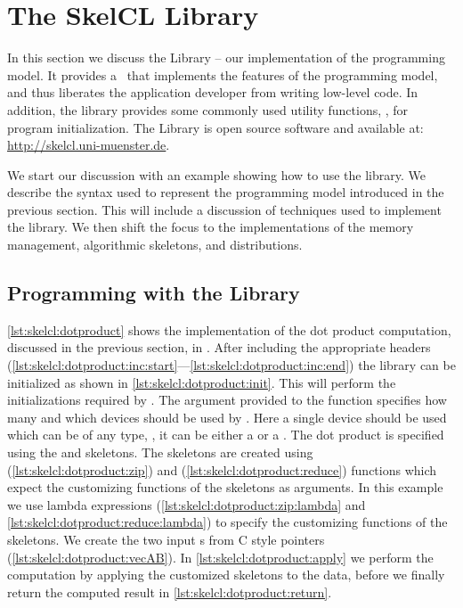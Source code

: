 \section{The SkelCL Library}
\label{section:skelcl-library}
In this section we discuss the \SkelCL Library -- our implementation of the \SkelCL programming model.
It provides a \Cpp~\API that implements the features of the \SkelCL programming model, and thus liberates the application developer from writing low-level code.
In addition, the library provides some commonly used utility functions, \eg, for program initialization.
The \SkelCL Library is open source software and available at: \url{http://skelcl.uni-muenster.de}.

We start our discussion with an example showing how to use the \SkelCL library.
We describe the syntax used to represent the \SkelCL programming model introduced in the previous section.
This will include a discussion of \Cpp techniques used to implement the library.
We then shift the focus to the implementations of the memory management, algorithmic skeletons, and distributions.










\subsection{Programming with the \SkelCL Library}

\autoref{lst:skelcl:dotproduct} shows the implementation of the dot product computation, discussed in the previous section, in \SkelCL.
After including the appropriate \SkelCL headers (\autoref{lst:skelcl:dotproduct:inc:start}---\autoref{lst:skelcl:dotproduct:inc:end}) the \SkelCL library can be initialized as shown in \autoref{lst:skelcl:dotproduct:init}.
This will perform the initializations required by \OpenCL.
The argument provided to the  function specifies how many and which \OpenCL devices should be used by \SkelCL.
Here a single device should be used which can be of any type, \ie, it can be either a \CPU or a \GPU.
The dot product is specified using the \zip and \reduce skeletons.
The skeletons are created using  (\autoref{lst:skelcl:dotproduct:zip}) and  (\autoref{lst:skelcl:dotproduct:reduce}) functions which expect the customizing functions of the skeletons as arguments.
In this example we use \Cpp lambda expressions (\autoref{lst:skelcl:dotproduct:zip:lambda} and \autoref{lst:skelcl:dotproduct:reduce:lambda}) to specify the customizing functions of the skeletons.
We create the two input s from C style pointers (\autoref{lst:skelcl:dotproduct:vecAB}).
In \autoref{lst:skelcl:dotproduct:apply} we perform the computation by applying the customized skeletons to the data, before we finally return the computed result in \autoref{lst:skelcl:dotproduct:return}.

